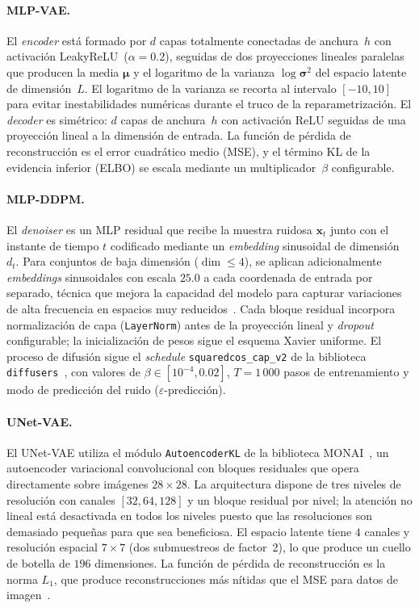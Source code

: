 \paragraph{MLP-VAE.}
El \emph{encoder} está formado por $d$ capas totalmente conectadas de anchura~$h$ con
activación LeakyReLU~($\alpha{=}0.2$), seguidas de dos proyecciones lineales paralelas
que producen la media $\boldsymbol{\mu}$ y el logaritmo de la varianza $\log
\boldsymbol{\sigma}^2$ del espacio latente de dimensión~$L$. El logaritmo de la varianza
se recorta al intervalo $[-10, 10]$ para evitar inestabilidades numéricas durante el
truco de la reparametrización. El \emph{decoder} es simétrico: $d$ capas de anchura~$h$
con activación ReLU seguidas de una proyección lineal a la dimensión de entrada. La
función de pérdida de reconstrucción es el error cuadrático medio (MSE), y el
término KL de la evidencia inferior (ELBO) se escala mediante un multiplicador~$\beta$
configurable.

\paragraph{MLP-DDPM.}
El \textit{denoiser} es un MLP residual que recibe la muestra
ruidosa $\mathbf{x}_t$ junto con el instante de tiempo $t$ codificado mediante
un \textit{embedding} sinusoidal de dimensión~$d_t$. Para conjuntos de baja dimensión
($\dim \leq 4$), se aplican adicionalmente \textit{embeddings} sinusoidales con
escala $25.0$ a cada coordenada de entrada por separado, técnica que mejora la
capacidad del modelo para capturar variaciones de alta frecuencia en espacios muy
reducidos~\cite{tancik_fourier_2020}. Cada bloque residual incorpora normalización
de capa (\texttt{LayerNorm}) antes de la proyección lineal y \textit{dropout}
configurable; la inicialización de pesos sigue el esquema Xavier uniforme. El
proceso de difusión sigue el \textit{schedule} \texttt{squaredcos\_cap\_v2} de la
biblioteca \texttt{diffusers}~\cite{von-platen-etal-2022-diffusers}, con valores de
$\beta \in [10^{-4}, 0.02]$, $T{=}1\,000$ pasos de entrenamiento y modo de predicción
del ruido ($\varepsilon$-predicción).

\paragraph{UNet-VAE.}
El UNet-VAE utiliza el módulo \texttt{AutoencoderKL} de la biblioteca
MONAI~\cite{cardoso_monai_2022}, un autoencoder variacional convolucional con
bloques residuales que opera directamente sobre imágenes $28\times28$. La arquitectura
dispone de tres niveles de resolución con canales $[32, 64, 128]$ y un bloque residual
por nivel; la atención no lineal está desactivada en todos los niveles puesto que las
resoluciones son demasiado pequeñas para que sea beneficiosa. El espacio latente tiene
$4$ canales y resolución espacial $7\times7$ (dos submuestreos de factor~2), lo que
produce un cuello de botella de $196$ dimensiones. La función de pérdida de
reconstrucción es la norma $L_1$, que produce reconstrucciones más nítidas que el MSE
para datos de imagen~\cite{zhao_loss_2017}.

